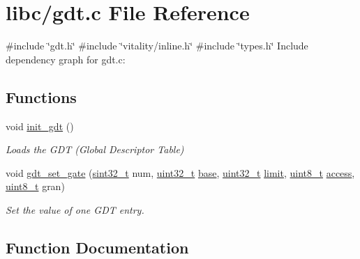 \hypertarget{a00056}{}\section{libc/gdt.c File Reference}
\label{a00056}
{\ttfamily \#include \char`\"{}gdt.\+h\char`\"{}}\newline
{\ttfamily \#include \char`\"{}vitality/inline.\+h\char`\"{}}\newline
{\ttfamily \#include \char`\"{}types.\+h\char`\"{}}\newline
Include dependency graph for gdt.\+c\+:
\subsection*{Functions}
\begin{DoxyCompactItemize}
\item 
void \hyperlink{a00056_a86bb50044169930202cc403376ef40c3_a86bb50044169930202cc403376ef40c3}{init\+\_\+gdt} ()
\begin{DoxyCompactList}\small\item\em Loads the G\+DT (Global Descriptor Table) \end{DoxyCompactList}\item 
void \hyperlink{a00056_abcf0775ea602ace125ae809475b6d8bf_abcf0775ea602ace125ae809475b6d8bf}{gdt\+\_\+set\+\_\+gate} (\hyperlink{a00092_ad838970452fe561cb8e0550cac5336be_ad838970452fe561cb8e0550cac5336be}{sint32\+\_\+t} num, \hyperlink{a00092_a435d1572bf3f880d55459d9805097f62_a435d1572bf3f880d55459d9805097f62}{uint32\+\_\+t} \hyperlink{a00065_a0523cedff47e2441fc198b7770ec5d3f_a0523cedff47e2441fc198b7770ec5d3f}{base}, \hyperlink{a00092_a435d1572bf3f880d55459d9805097f62_a435d1572bf3f880d55459d9805097f62}{uint32\+\_\+t} \hyperlink{a00065_ab28e82ae69032cb4ad3ec3a0be3d7129_ab28e82ae69032cb4ad3ec3a0be3d7129}{limit}, \hyperlink{a00092_aba7bc1797add20fe3efdf37ced1182c5_aba7bc1797add20fe3efdf37ced1182c5}{uint8\+\_\+t} \hyperlink{a00059_a8b0d6200bc639dd37ff68847a0adde5f_a8b0d6200bc639dd37ff68847a0adde5f}{access}, \hyperlink{a00092_aba7bc1797add20fe3efdf37ced1182c5_aba7bc1797add20fe3efdf37ced1182c5}{uint8\+\_\+t} gran)
\begin{DoxyCompactList}\small\item\em Set the value of one G\+DT entry. \end{DoxyCompactList}\end{DoxyCompactItemize}


\subsection{Function Documentation}
\mbox{\label{a00056_abcf0775ea602ace125ae809475b6d8bf_abcf0775ea602ace125ae809475b6d8bf}} 
